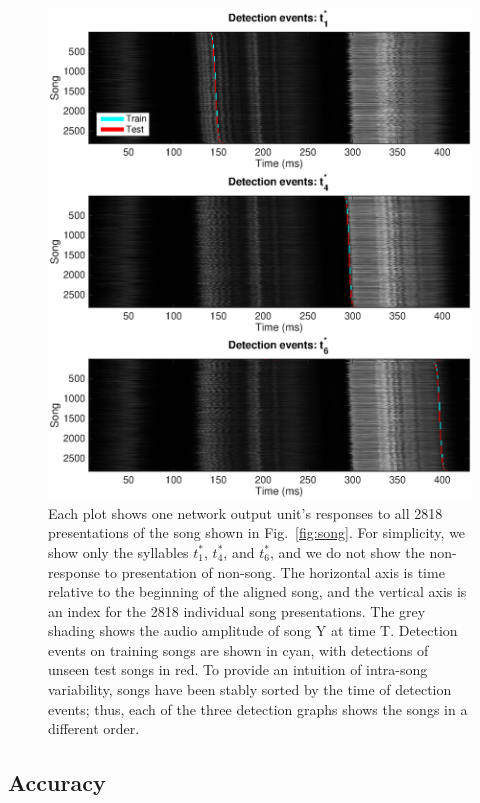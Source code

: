 \documentclass[10pt,letterpaper]{article}
\newcommand\fig[1]{Fig.~\ref{#1}}
\begin{document}
\begin{figure}
  \includegraphics[width=\textwidth]{Fig2}
  \caption{Each plot shows one network output unit's responses to all
    2818 presentations of the song shown in \fig{fig:song}.  For
    simplicity, we show only the syllables $t^*_1$, $t^*_4$, and
    $t^*_6$, and we do not show the non-response to presentation of non-song. The horizontal axis is time relative to the beginning of
    the aligned song, and the vertical axis is an index for the 2818
    individual song presentations. The grey shading shows the audio
    amplitude of song Y at time T. Detection events on training songs
    are shown in cyan, with detections of unseen test songs in red.  To provide an intuition of intra-song variability, songs have been
    stably sorted by the time of detection events; thus, each of the
    three detection graphs shows the songs in a different order.}
  \label{fig:detection_raster}
\end{figure}

\subsection{Accuracy}
\end{document}
